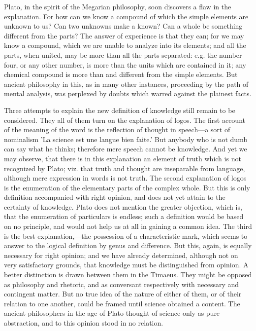 \documentclass[11pt,letter]{article}
\begin{document}
\par  Plato, in the spirit of the Megarian philosophy, soon discovers a flaw in the explanation. For how can we know a compound of which the simple elements are unknown to us? Can two unknowns make a known? Can a whole be something different from the parts? The answer of experience is that they can; for we may know a compound, which we are unable to analyze into its elements; and all the parts, when united, may be more than all the parts separated: e.g. the number four, or any other number, is more than the units which are contained in it; any chemical compound is more than and different from the simple elements. But ancient philosophy in this, as in many other instances, proceeding by the path of mental analysis, was perplexed by doubts which warred against the plainest facts.

\par  Three attempts to explain the new definition of knowledge still remain to be considered. They all of them turn on the explanation of logos. The first account of the meaning of the word is the reflection of thought in speech—a sort of nominalism 'La science est une langue bien faite.' But anybody who is not dumb can say what he thinks; therefore mere speech cannot be knowledge. And yet we may observe, that there is in this explanation an element of truth which is not recognized by Plato; viz. that truth and thought are inseparable from language, although mere expression in words is not truth. The second explanation of logos is the enumeration of the elementary parts of the complex whole. But this is only definition accompanied with right opinion, and does not yet attain to the certainty of knowledge. Plato does not mention the greater objection, which is, that the enumeration of particulars is endless; such a definition would be based on no principle, and would not help us at all in gaining a common idea. The third is the best explanation,—the possession of a characteristic mark, which seems to answer to the logical definition by genus and difference. But this, again, is equally necessary for right opinion; and we have already determined, although not on very satisfactory grounds, that knowledge must be distinguished from opinion. A better distinction is drawn between them in the Timaeus. They might be opposed as philosophy and rhetoric, and as conversant respectively with necessary and contingent matter. But no true idea of the nature of either of them, or of their relation to one another, could be framed until science obtained a content. The ancient philosophers in the age of Plato thought of science only as pure abstraction, and to this opinion stood in no relation.
\end{document}
